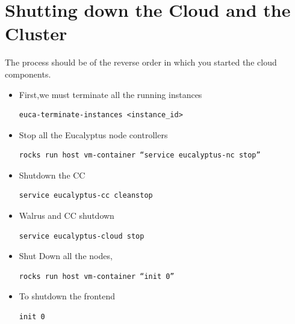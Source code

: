 \section{Shutting down the Cloud and the Cluster}
The process should be of the reverse order in which you started the cloud components.
\begin{itemize}
\item First,we must terminate all the running instances
\begin{lstlisting}
euca-terminate-instances <instance_id>
\end{lstlisting}
\item Stop all the Eucalyptus node controllers
\begin{lstlisting}
rocks run host vm-container “service eucalyptus-nc stop”
\end{lstlisting}
\item Shutdown the CC
\begin{lstlisting}
service eucalyptus-cc cleanstop
\end{lstlisting}
\item Walrus and CC shutdown 
\begin{lstlisting}
service eucalyptus-cloud stop
\end{lstlisting}
\item Shut Down all the nodes,
\begin{lstlisting}
rocks run host vm-container “init 0”
\end{lstlisting}
\item To shutdown the frontend 
\begin{lstlisting}
init 0
\end{lstlisting}
\end{itemize}

